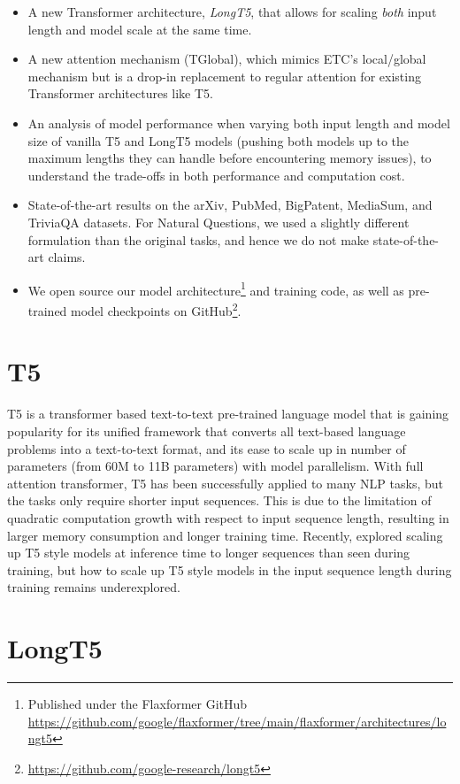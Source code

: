 \begin{itemize}
    \item A new Transformer architecture, {\em LongT5}, that allows for scaling {\em both} input length and model scale at the same time.
    \item A new attention mechanism (TGlobal), which mimics ETC's local/global mechanism but is a drop-in replacement to regular attention for existing Transformer architectures like T5.
    \item An analysis of model performance when varying both input length and model size of vanilla T5 and LongT5 models (pushing both models up to the maximum lengths they can handle before encountering memory issues), to understand the trade-offs in both performance and computation cost.
    \item State-of-the-art results on the arXiv, PubMed, BigPatent, MediaSum, and TriviaQA datasets. For Natural Questions, we used a slightly different formulation than the original tasks, and hence we do not make state-of-the-art claims.
    \item We open source our model architecture\footnote{Published under the Flaxformer GitHub \url{https://github.com/google/flaxformer/tree/main/flaxformer/architectures/longt5}} and training code, as well as pre-trained model checkpoints on GitHub\footnote{\url{https://github.com/google-research/longt5}}.
\end{itemize}

\section{T5}\label{sec:t5}
T5 \cite{t5} is a transformer based text-to-text pre-trained language model that is gaining popularity for its unified framework that converts all text-based language problems into a text-to-text format, and its ease to scale up in number of parameters (from 60M to 11B parameters) with model parallelism. With full attention transformer, T5 has been successfully applied to many NLP tasks, but the tasks only require shorter input sequences. This is due to the limitation of quadratic computation growth with respect to input sequence length, resulting in larger memory consumption and longer training time. Recently, \citet{trainshort_testlong} explored scaling up T5 style models at inference time to longer sequences than seen during training, but how to scale up T5 style models in the input sequence length during training remains underexplored.

\section{LongT5}\label{sec:longt5}
